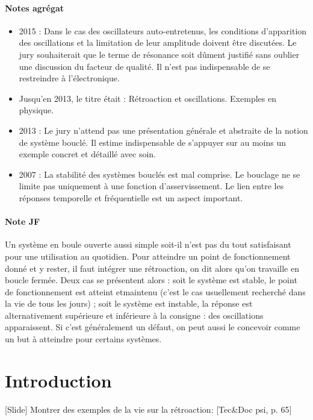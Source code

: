 \documentclass[11pt]{report}
\numberwithin{figure}{section}
\numberwithin{equation}{section}
\numberwithin{table}{section}
\newcommand{\1}{\boldsymbol{1}}
\begin{document}
\paragraph{Notes agrégat}
\begin{itemize}
\item 2015 : Dans le cas des oscillateurs auto-entretenus, les conditions d’apparition des oscillations
et la limitation de leur amplitude doivent être discutées. Le jury souhaiterait que
le terme de résonance soit dûment justifié sans oublier une discussion du facteur de
qualité. Il n’est pas indispensable de se restreindre à l’électronique.
\item Jusqu’en 2013, le titre était : Rétroaction et oscillations. Exemples en physique.
\item 2013 : Le jury n’attend pas une présentation générale et abstraite de la notion de système bouclé.  Il
estime indispensable de s’appuyer sur au moins un exemple concret et détaillé avec soin.
\item 2007 : La stabilité des systèmes bouclés est mal comprise. Le bouclage ne se limite pas uniquement à une
fonction d’asservissement. Le lien entre les réponses temporelle et fréquentielle est un aspect important.
\end{itemize}

\paragraph{Note JF} Un système en boule ouverte aussi simple soit-il n’est pas du tout satisfaisant pour une utilisation au quotidien. Pour atteindre un point de fonctionnement donné et y rester, il faut intégrer une rétroaction, on dit alors qu’on travaille en boucle fermée. Deux cas se présentent alors : soit le système est stable, le point de fonctionnement est atteint etmaintenu (c’est le cas usuellement recherché dans la vie de tous les jours) ; soit le système est instable, la réponse est alternativement supérieure et inférieure à la consigne : des oscillations apparaissent. Si c’est généralement un défaut, on peut aussi le concevoir comme un but à atteindre pour certains systèmes.

\section*{Introduction}
  
[Slide] Montrer des exemples de la vie sur la rétroaction: [Tec\&Doc psi, p. 65]
\end{document}
